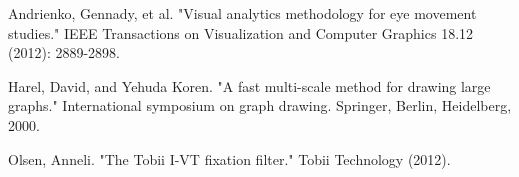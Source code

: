 \documentclass{llncs}
\begin{document}
\begin{thebibliography}{5}
Andrienko, Gennady, et al. "Visual analytics methodology for eye movement studies." IEEE Transactions on Visualization and Computer Graphics 18.12 (2012): 2889-2898.

Harel, David, and Yehuda Koren. "A fast multi-scale method for drawing large graphs." International symposium on graph drawing. Springer, Berlin, Heidelberg, 2000.

Olsen, Anneli. "The Tobii I-VT fixation filter." Tobii Technology (2012).

\end{thebibliography}
\end{document}
